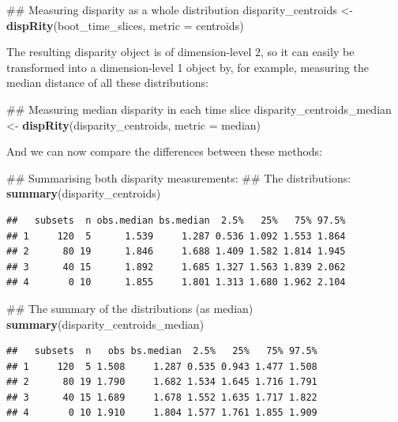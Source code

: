 \documentclass[]{book}
\newenvironment{Shaded}{\begin{snugshade}}{\end{snugshade}}
\newcommand{\KeywordTok}[1]{\textcolor[rgb]{0.13,0.29,0.53}{\textbf{#1}}}
\newcommand{\DataTypeTok}[1]{\textcolor[rgb]{0.13,0.29,0.53}{#1}}
\newcommand{\StringTok}[1]{\textcolor[rgb]{0.31,0.60,0.02}{#1}}
\newcommand{\NormalTok}[1]{#1}
\theoremstyle{definition}
\theoremstyle{definition}
\theoremstyle{remark}
\begin{document}
\begin{Shaded}
\begin{Highlighting}[]
\NormalTok{## Measuring disparity as a whole distribution}
\NormalTok{disparity_centroids <-}\StringTok{ }\KeywordTok{dispRity}\NormalTok{(boot_time_slices, }\DataTypeTok{metric =}\NormalTok{ centroids)}
\end{Highlighting}
\end{Shaded}

The resulting disparity object is of dimension-level 2, so it can easily
be transformed into a dimension-level 1 object by, for example,
measuring the median distance of all these distributions:

\begin{Shaded}
\begin{Highlighting}[]
\NormalTok{## Measuring median disparity in each time slice}
\NormalTok{disparity_centroids_median <-}\StringTok{ }\KeywordTok{dispRity}\NormalTok{(disparity_centroids, }\DataTypeTok{metric =}\NormalTok{ median)}
\end{Highlighting}
\end{Shaded}

And we can now compare the differences between these methods:

\begin{Shaded}
\begin{Highlighting}[]
\NormalTok{## Summarising both disparity measurements:}
\NormalTok{## The distributions:}
\KeywordTok{summary}\NormalTok{(disparity_centroids)}
\end{Highlighting}
\end{Shaded}

\begin{verbatim}
##   subsets  n obs.median bs.median  2.5%   25%   75% 97.5%
## 1     120  5      1.539     1.287 0.536 1.092 1.553 1.864
## 2      80 19      1.846     1.688 1.409 1.582 1.814 1.945
## 3      40 15      1.892     1.685 1.327 1.563 1.839 2.062
## 4       0 10      1.855     1.801 1.313 1.680 1.962 2.104
\end{verbatim}

\begin{Shaded}
\begin{Highlighting}[]
\NormalTok{## The summary of the distributions (as median)}
\KeywordTok{summary}\NormalTok{(disparity_centroids_median)}
\end{Highlighting}
\end{Shaded}

\begin{verbatim}
##   subsets  n   obs bs.median  2.5%   25%   75% 97.5%
## 1     120  5 1.508     1.287 0.535 0.943 1.477 1.508
## 2      80 19 1.790     1.682 1.534 1.645 1.716 1.791
## 3      40 15 1.689     1.678 1.552 1.635 1.717 1.822
## 4       0 10 1.910     1.804 1.577 1.761 1.855 1.909
\end{verbatim}
\end{document}
